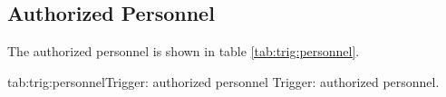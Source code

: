 \begin{safetyen}{10}{15}
\subsection{Authorized  Personnel} 
\end{safetyen}
The authorized personnel is shown in table \ref{tab:trig:personnel}.
\begin{namestab}{tab:trig:personnel}{Trigger: authorized personnel}{%
      Trigger: authorized personnel.}
  \BodoReitz{}
\end{namestab}

%
%
%
%
%
%
%
%
%
